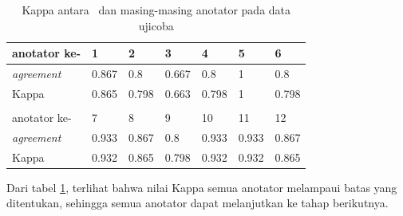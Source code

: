 \begin{table}
	\centering
	\caption{Kappa antara \saya~dan masing-masing anotator pada data ujicoba}
	\label{table:cohensKappa}
	\begin{tabular}{lllllll}
		\hline
		\multicolumn{1}{|l|}{anotator ke-} & \multicolumn{1}{l|}{1} & \multicolumn{1}{l|}{2} & \multicolumn{1}{l|}{3} & \multicolumn{1}{l|}{4} & \multicolumn{1}{l|}{5} & \multicolumn{1}{l|}{6} \\ \hline
		\multicolumn{1}{|l|}{\textit{agreement}} & \multicolumn{1}{l|}{0.867} & \multicolumn{1}{l|}{0.8} & \multicolumn{1}{l|}{0.667} & \multicolumn{1}{l|}{0.8} & \multicolumn{1}{l|}{1} & \multicolumn{1}{l|}{0.8} \\ \hline
		\multicolumn{1}{|l|}{Kappa} & \multicolumn{1}{l|}{0.865} & \multicolumn{1}{l|}{0.798} & \multicolumn{1}{l|}{0.663} & \multicolumn{1}{l|}{0.798} & \multicolumn{1}{l|}{1} & \multicolumn{1}{l|}{0.798} \\ \hline
		\multicolumn{7}{l}{} \\ \hline
		\multicolumn{1}{|l|}{anotator ke-} & \multicolumn{1}{l|}{7} & \multicolumn{1}{l|}{8} & \multicolumn{1}{l|}{9} & \multicolumn{1}{l|}{10} & \multicolumn{1}{l|}{11} & \multicolumn{1}{l|}{12} \\ \hline
		\multicolumn{1}{|l|}{\textit{agreement}} & \multicolumn{1}{l|}{0.933} & \multicolumn{1}{l|}{0.867} & \multicolumn{1}{l|}{0.8} & \multicolumn{1}{l|}{0.933} & \multicolumn{1}{l|}{0.933} & \multicolumn{1}{l|}{0.867} \\ \hline
		\multicolumn{1}{|l|}{Kappa} & \multicolumn{1}{l|}{0.932} & \multicolumn{1}{l|}{0.865} & \multicolumn{1}{l|}{0.798} & \multicolumn{1}{l|}{0.932} & \multicolumn{1}{l|}{0.932} & \multicolumn{1}{l|}{0.865} \\ \hline
	\end{tabular}
\end{table}
\noindent Dari tabel \ref{table:cohensKappa}, terlihat bahwa nilai Kappa semua anotator melampaui batas yang ditentukan, sehingga semua anotator dapat melanjutkan ke tahap berikutnya.

